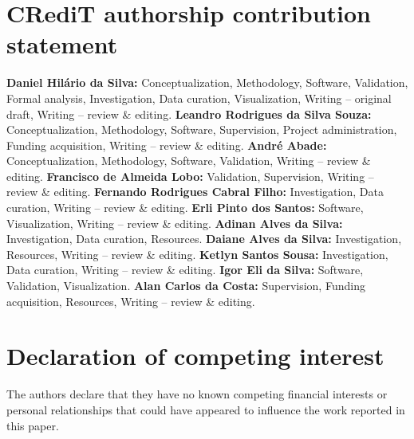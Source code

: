 \documentclass[11pt, letterpaper]{article}
\begin{document}
\section*{CRediT authorship contribution statement}
\textbf{Daniel Hil\'ario da Silva:} Conceptualization, Methodology, Software, Validation, Formal analysis, Investigation, Data curation, Visualization, Writing -- original draft, Writing -- review \& editing. \textbf{Leandro Rodrigues da Silva Souza:} Conceptualization, Methodology, Software, Supervision, Project administration, Funding acquisition, Writing -- review \& editing. \textbf{Andr\'e Abade:} Conceptualization, Methodology, Software, Validation, Writing -- review \& editing. \textbf{Francisco de Almeida Lobo:} Validation, Supervision, Writing -- review \& editing. \textbf{Fernando Rodrigues Cabral Filho:} Investigation, Data curation, Writing -- review \& editing. \textbf{Erli Pinto dos Santos:} Software, Visualization, Writing -- review \& editing. \textbf{Adinan Alves da Silva:} Investigation, Data curation, Resources. \textbf{Daiane Alves da Silva:} Investigation, Resources, Writing -- review \& editing. \textbf{Ketlyn Santos Sousa:} Investigation, Data curation, Writing -- review \& editing. \textbf{Igor Eli da Silva:} Software, Validation, Visualization. \textbf{Alan Carlos da Costa:} Supervision, Funding acquisition, Resources, Writing -- review \& editing.

\section*{Declaration of competing interest}
The authors declare that they have no known competing financial interests or personal relationships that could have appeared to influence the work reported in this paper.
\end{document}
